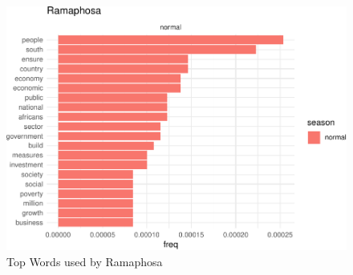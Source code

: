 \documentclass[]{article}
\begin{document}
\begin{figure}[H]

{\centering \includegraphics{datasci_fi_Assignment_2_files/figure-latex/Ramaphosa -1} 

}

\caption{Top Words used by Ramaphosa}\label{fig:Ramaphosa }
\end{figure}
\end{document}
